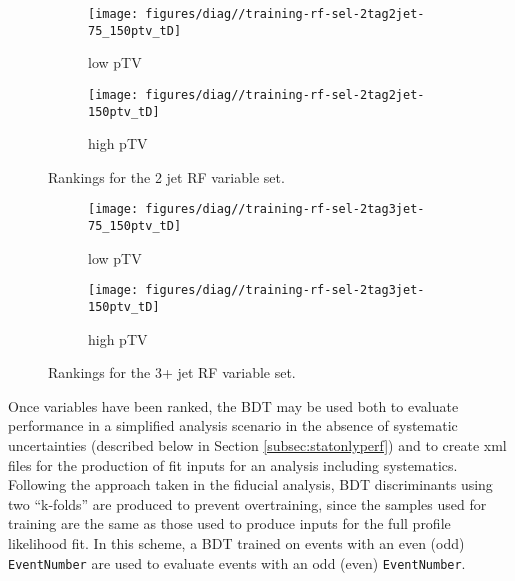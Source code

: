 \begin{figure}[!htbp]\captionsetup{justification=centering}
  \centering
\begin{subfigure}[t]{0.49\textwidth}\centering\texttt{[image: figures/diag//training-rf-sel-2tag2jet-75\_150ptv\_tD]}\caption{low pTV}\end{subfigure}
\begin{subfigure}[t]{0.49\textwidth}\centering\texttt{[image: figures/diag//training-rf-sel-2tag2jet-150ptv\_tD]}\caption{high pTV}\end{subfigure}
  \caption{Rankings for the 2 jet RF variable set.}
  \label{fig:rf-sel-Ranking}
\end{figure}
\begin{figure}[!htbp]\captionsetup{justification=centering}
  \centering
\begin{subfigure}[t]{0.49\textwidth}\centering\texttt{[image: figures/diag//training-rf-sel-2tag3jet-75\_150ptv\_tD]}\caption{low pTV}\end{subfigure}
\begin{subfigure}[t]{0.49\textwidth}\centering\texttt{[image: figures/diag//training-rf-sel-2tag3jet-150ptv\_tD]}\caption{high pTV}\end{subfigure}
  \caption{Rankings for the 3+ jet RF variable set.}
  \label{fig:rf-sel-Ranking3}
\end{figure}

Once variables have been ranked, the BDT may be used both to evaluate performance in a simplified analysis scenario in the absence of systematic uncertainties (described below in Section \ref{subsec:statonlyperf}) and to create xml files for the production of fit inputs for an analysis including systematics.  Following the approach taken in the fiducial analysis, BDT discriminants using two ``k-folds'' are produced to prevent overtraining, since the samples used for training are the same as those used to produce inputs for the full profile likelihood fit.  In this scheme, a BDT trained on events with an even (odd) \texttt{EventNumber} are used to evaluate events with an odd (even) \texttt{EventNumber}.

